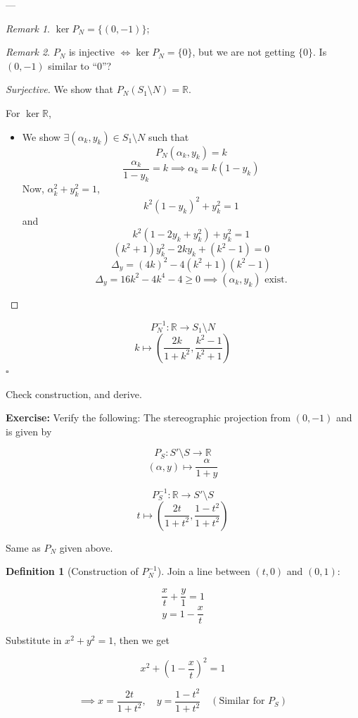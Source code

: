 \documentclass[11pt]{article}
\theoremstyle{definition}
\newtheorem{definition}{Definition}[section]
\theoremstyle{remark}
\newtheorem{remark}{Remark}[section]
\begin{document}
---

\begin{remark}
$\ker P_N = \{(0,-1)\}$;
\end{remark}

\begin{remark}
$P_N$ is injective $\iff \ker P_N = \{0\}$, but we are not getting $\{0\}$. Is $(0,-1)$ similar to ``$0$''?
\end{remark}

\begin{proof}[Surjective]
We show that $P_N (S_1 \setminus N) = \mathbb{R}$.

For $\ker \mathbb{R}$,
\begin{itemize}
    \item We show $\exists (\alpha_k, y_k) \in S_1 \setminus N$ such that
    \[
    P_N (\alpha_k, y_k) = k
    \]
    \[
    \frac{\alpha_k}{1-y_k} = k \implies \alpha_k = k(1-y_k)
    \]
    Now, $\alpha_k^2 + y_k^2 = 1$,
    \[
    k^2(1-y_k)^2 + y_k^2 = 1
    \]
    and
    \[
    k^2(1-2y_k + y_k^2) + y_k^2 = 1
    \]
    \[
    (k^2+1)y_k^2 - 2ky_k + (k^2-1) = 0
    \]
    \[
    \Delta_y = (4k)^2 - 4(k^2+1)(k^2-1)
    \]
    \[
    \Delta_y = 16k^2 - 4k^4 - 4 \geq 0 \implies (\alpha_k, y_k) \text{ exist.}
    \]
\end{itemize}
\end{proof}

\[
P_N^{-1} : \mathbb{R} \to S_1 \setminus N
\]
\[
k \mapsto \left( \frac{2k}{1+k^2}, \frac{k^2-1}{k^2+1} \right)
\]
$\square$

Check construction, and derive.

\textbf{Exercise:}
Verify the following: The stereographic projection from $(0, -1)$ and is given by

\[
P_S \colon S' \setminus S \to \mathbb{R}
\]
\[
(\alpha, y) \mapsto \frac{\alpha}{1 + y}
\]

\[
P_S^{-1} \colon \mathbb{R} \to S' \setminus S
\]
\[
t \mapsto \left( \frac{2t}{1 + t^2}, \frac{1 - t^2}{1 + t^2} \right)
\]

Same as $P_N$ given above.

\begin{definition}[Construction of $P_N^{-1}$]
Join a line between $(t, 0)$ and $(0, 1)$:

\[
\frac{x}{t} + \frac{y}{1} = 1
\]
\[
y = 1 - \frac{x}{t}
\]

Substitute in $x^2 + y^2 = 1$, then we get

\[
x^2 + \left(1 - \frac{x}{t}\right)^2 = 1
\]

\[
\implies x = \frac{2t}{1 + t^2}, \quad y = \frac{1 - t^2}{1 + t^2} \quad (\text{Similar for } P_S)
\]
\end{definition}
\end{document}
